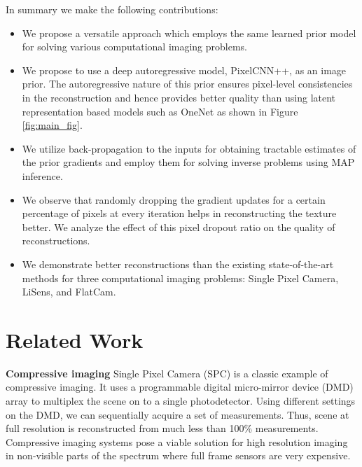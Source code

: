 \documentclass[journal,twoside]{IEEEtran}
\begin{document}
In summary we make the following contributions: 
\begin{itemize}
    \item We propose a versatile approach which employs the same learned prior model for solving various computational imaging problems. 
    
    \item We propose to use a deep autoregressive model, PixelCNN++, as an image prior. The autoregressive nature of this prior ensures pixel-level consistencies in the reconstruction and hence provides better quality than using latent representation based models such as OneNet \cite{chang2017one} as shown in Figure \ref{fig:main_fig}.
    
    \item We utilize back-propagation to the inputs for obtaining tractable estimates of the prior gradients and employ them for solving inverse problems using MAP inference.
    
    \item We observe that randomly dropping the gradient updates for a certain percentage of pixels at every iteration helps in reconstructing the texture better. We analyze the effect of this pixel dropout ratio on the quality of reconstructions.
    
    \item We demonstrate better reconstructions than the existing state-of-the-art methods for three computational imaging problems: Single Pixel Camera, LiSens, and FlatCam. 
\end{itemize}



















\section{Related Work}





\textbf{Compressive imaging} Single Pixel Camera (SPC) \cite{duarte2008single} is a classic example of compressive imaging. It uses a programmable digital micro-mirror device (DMD) array to multiplex the scene on to a single photodetector. Using different settings on the DMD, we can sequentially acquire a set of measurements. Thus, scene at full resolution is reconstructed from much less than 100\% measurements. Compressive imaging systems pose a viable solution for high resolution imaging in non-visible parts of the spectrum where full frame sensors are very expensive. 
\end{document}
